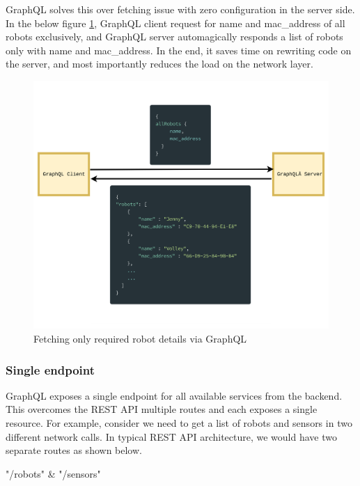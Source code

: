 	GraphQL solves this over fetching issue with zero configuration in the server side. In the below figure \ref{fig:graphql_declarative}, GraphQL client request for name and mac\_address of all robots exclusively, and GraphQL server automagically responds a list of robots only with name and mac\_address. In the end, it saves time on rewriting code on the server, and most importantly reduces the load on the network layer.
	\newpage
	\begin{figure}[!htbp] 
		\begin{center}
			\includegraphics[trim={0 0 0 2cm},clip,scale=0.07]{./images/png/graphql_declarative}	
			\caption{Fetching only required robot details via GraphQL}	
			\label{fig:graphql_declarative}	
		\end{center}
	\end{figure}

	\subsubsection{Single endpoint}
	
	GraphQL exposes a single endpoint for all available services from the backend. This overcomes the REST API multiple routes and each exposes a single resource. For example, consider we need to get a list of robots and sensors in two different network calls. In typical REST API architecture, we would have two separate routes as shown below.
	
	"/robots" \& "/sensors"
	
